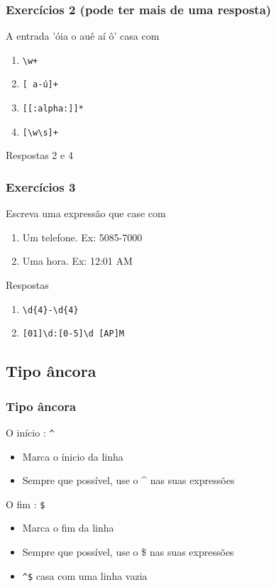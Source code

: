 \documentclass{beamer}
\begin{document}
\begin{frame}[fragile]
 \frametitle{Exercícios 2 (pode ter mais de uma resposta)}
 \begin{block}{A entrada 'óia o auê aí ô' casa com}
  \begin{enumerate}
   \item \verb=\w+=
   \item \verb=[ a-ú]+=
   \item \verb=[[:alpha:]]*=
   \item \verb=[\w\s]+=
  \end{enumerate}
 \end{block}

 \pause
 \begin{block}{Respostas}
  2 e 4
 \end{block}
\end{frame}

\begin{frame}[fragile]
 \frametitle{Exercícios 3}
 \begin{block}{Escreva uma expressão que case com}
  \begin{enumerate}
   \item Um telefone. Ex: 5085-7000
   \item Uma hora. Ex: 12:01 AM
  \end{enumerate}
 \end{block}

 \pause
 \begin{block}{Respostas}
  \begin{enumerate}
   \item \verb=\d{4}-\d{4}=
	\pause
   \item \verb=[01]\d:[0-5]\d [AP]M=
  \end{enumerate}
 \end{block}
\end{frame}

\subsection{Tipo âncora}
\begin{frame}[fragile]
 \frametitle{Tipo âncora}
 \begin{block}{O início : \texttt{\^{}}}
  \begin{itemize}
   \item Marca o ínicio da linha
   \item Sempre que possível, use o \^{} nas suas expressões
  \end{itemize}
 \end{block}

 \pause
 \begin{block}{O fim : \texttt{\$}}
  \begin{itemize}
   \item Marca o fim da linha
   \item Sempre que possível, use o \$ nas suas expressões
   \item \verb=^$= casa com uma linha vazia
  \end{itemize}
 \end{block}
\end{frame}
\end{document}
